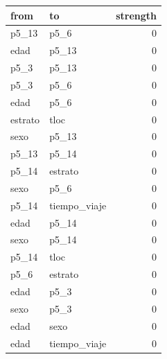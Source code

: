 
\centering
\begin{tabular}{llr}
\toprule
from & to & strength\\
\midrule
p5\_13 & p5\_6 & 0\\
edad & p5\_13 & 0\\
p5\_3 & p5\_13 & 0\\
p5\_3 & p5\_6 & 0\\
edad & p5\_6 & 0\\
\addlinespace
estrato & tloc & 0\\
sexo & p5\_13 & 0\\
p5\_13 & p5\_14 & 0\\
p5\_14 & estrato & 0\\
sexo & p5\_6 & 0\\
\addlinespace
p5\_14 & tiempo\_viaje & 0\\
edad & p5\_14 & 0\\
sexo & p5\_14 & 0\\
p5\_14 & tloc & 0\\
p5\_6 & estrato & 0\\
\addlinespace
edad & p5\_3 & 0\\
sexo & p5\_3 & 0\\
edad & sexo & 0\\
edad & tiempo\_viaje & 0\\
\bottomrule
\end{tabular}
